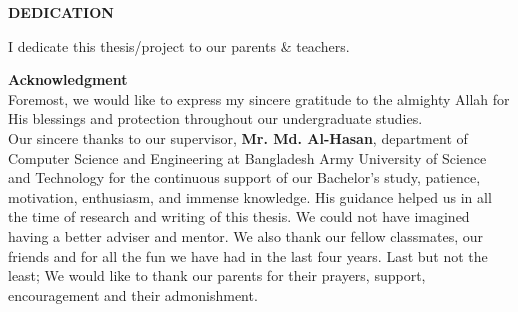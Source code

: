 \documentclass[12pt,a4paper]{report}
\begin{document}
\begin{titlepage}
	
	\newpage
	\begin{center}
	\textbf{DEDICATION}
	\end{center}
	\vspace{.2em}
	\begin{center}
	I dedicate this thesis/project to our parents \& teachers.
	\end{center}
\end{titlepage}

	\thispagestyle{fancy}
	\setcounter{page}{6}
	\tableofcontents\thispagestyle{fancy}\newpage
	\listoffigures\thispagestyle{fancy}\newpage
	\listoftables\thispagestyle{fancy}\newpage
	
	\begin{titlepage}
	\vspace*{.05cm}	
		\thispagestyle{fancy}
		\setcounter{page}{10}
		\centering 
		{\fontsize{20}{10}\selectfont \textbf{Acknowledgment}}\\
		\vspace{0.6cm}
		\justify Foremost, we would like to express my sincere gratitude to the almighty Allah for His blessings and protection throughout our undergraduate studies.\\ 
Our sincere thanks to our supervisor,  \textbf{Mr. Md. Al-Hasan}, department of Computer Science and Engineering at Bangladesh Army University of Science and Technology for the continuous support of our Bachelor's study, patience, motivation, enthusiasm, and immense knowledge. His guidance helped us in all the time of research and writing of this thesis. We could not have imagined having a better adviser and mentor. We also thank our fellow classmates, our friends and for all the fun we have had in the last four years.
        Last but not the least; We would like to thank our parents for their prayers, support, encouragement and their admonishment. 
		
	\newpage
	
	\centering 
	

\end{titlepage}
\end{document}
